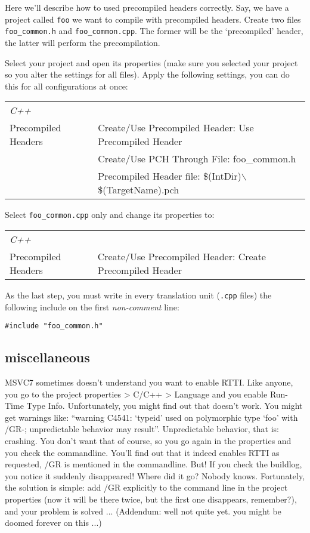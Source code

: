 \documentclass[10pt,a4paper,titlepage,dutch]{report}
\begin{document}
Here we'll describe how to used precompiled headers correctly.
Say, we have a project called \verb|foo| we want to compile with
precompiled headers. Create two files \verb|foo_common.h| and
\verb|foo_common.cpp|. The former will be the `precompiled'
header, the latter will perform the precompilation.

Select your project and open its properties (make sure you
selected your project so you alter the settings for all files).
Apply the following settings, you can do this for all
configurations at once:

\begin{tabular}{|l|l|}
  \hline
  \emph{C++} & \\
  Precompiled Headers & Create/Use Precompiled Header: Use Precompiled Header\\
  & Create/Use PCH Through File: foo\_common.h\\
  & Precompiled Header file:
  \$(IntDir)$\backslash$\$(TargetName).pch\\
  \hline
\end{tabular}

Select \verb|foo_common.cpp| only and change its properties to:

\begin{tabular}{|l|l|}
  \hline
  \emph{C++} & \\
  Precompiled Headers & Create/Use Precompiled Header: Create Precompiled Header\\
  \hline
\end{tabular}

As the last step, you must write in every translation unit
(\verb|.cpp| files) the following include on the first
\emph{non-comment} line:

\verb|#include "foo_common.h"|

\subsection{miscellaneous}

MSVC7 sometimes doesn't understand you want to enable RTTI.  Like
anyone, you go to the project properties > C/C++ > Language and
you enable Run-Time Type Info.  Unfortunately, you might find out
that doesn't work.  You might get warnings like: ``warning C4541:
`typeid' used on polymorphic type `foo' with /GR-; unpredictable
behavior may result''.  Unpredictable behavior, that is: crashing.
You don't want that of course, so you go again in the properties
and you check the commandline.  You'll find out that it indeed
enables RTTI as requested, /GR is mentioned in the commandline.
But!  If you check the buildlog, you notice it suddenly
disappeared!  Where did it go?  Nobody knows.  Fortunately, the
solution is simple: add /GR explicitly to the command line in the
project properties (now it will be there twice, but the first one
disappears, remember?), and your problem is solved ...  (Addendum:
well not quite yet.  you might be doomed forever on this ...)
\end{document}
